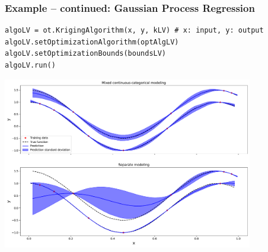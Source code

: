 \documentclass{beamer}
\begin{document}
\begin{frame}[containsverbatim]
  \frametitle{Example -- continued: Gaussian Process Regression}
\small


\begin{lstlisting}
algoLV = ot.KrigingAlgorithm(x, y, kLV) # x: input, y: output
algoLV.setOptimizationAlgorithm(optAlgLV)
algoLV.setOptimizationBounds(boundsLV)
algoLV.run()
\end{lstlisting}
\vspace{-0.19cm}
\centering
\includegraphics[width=0.82\textwidth]{figures/latent_variable_model.pdf}

\end{frame}



	
	
\end{document}

